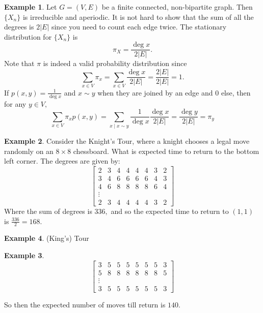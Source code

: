 \documentclass[10pt, oneside]{article}
\theoremstyle{definition}
\newtheorem{exmp}{Example}[section]
\begin{document}
\begin{exmp}
    Let $G = (V,E)$ be a finite connected, non-bipartite graph. Then $\{X_n\}$ is irreducible and aperiodic. It is not hard to show that the sum of all the degrees is $2|E|$ since you need to count each edge twice. The stationary distribution for $\{X_n\}$ is 
    \[\pi_X = \frac{\deg x}{2|E|}.\] Note that $\pi$ is indeed a valid probability distribution since
    \[\sum_{x\in V} \pi_x = \sum_{x\in V}\frac{\deg x}{2 |E|} = \frac{2 |E|}{2 |E|} = 1.\] If $p(x,y) = \frac{1}{\deg x}$ and $x\sim y$ when they are joined by an edge and $0$ else, then for any $y \in V,$ 
    \[\sum_{x \in V}\pi_x p(x,y) = \sum_{x \mid x\sim y} \frac{1}{\deg x}\frac{\deg x}{ 2  |E|} = \frac{\deg y}{2 |E|} = \pi_y\]
\end{exmp}

\begin{exmp}
    Consider the Knight's Tour, where a knight chooses a legal move randomly on an $8 \times 8$ chessboard. What is expected time to return to the bottom left corner. The degrees are given by:
    \[\begin{bmatrix}
        2 & 3 & 4 & 4 & 4 & 4& 3 & 2\\
        3 & 4 & 6 & 6 & 6 & 6 & 4 & 3\\
        4 & 6 & 8 & 8 & 8 & 8 & 6 & 4\\
        \vdots\\
        2 & 3 & 4 & 4 & 4 & 4 & 3 & 2
    \end{bmatrix}\]
    Where the sum of degrees is $336,$ and so the expected time to return to $(1,1)$ is $\frac{336}{2}= 168.$
\end{exmp}

\begin{exmp}
    (King's) Tour
    \begin{exmp}
        \[\begin{bmatrix}
            3 & 5 & 5 & 5 & 5 & 5 & 5 & 3\\
            5 & 8 & 8 & 8 & 8 & 8 &8 &5\\
            \vdots\\
            3 & 5 & 5 & 5 & 5 & 5 & 5 & 3
        \end{bmatrix}\]
    \end{exmp}
    So then the expected number of moves till return is $140.$
\end{exmp}

\newpage
\end{document}
